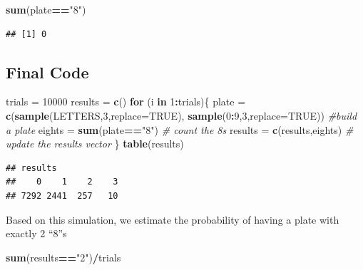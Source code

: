 \documentclass[
]{book}
\newenvironment{Shaded}{\begin{snugshade}}{\end{snugshade}}
\newcommand{\AttributeTok}[1]{\textcolor[rgb]{0.13,0.29,0.53}{#1}}
\newcommand{\CommentTok}[1]{\textcolor[rgb]{0.56,0.35,0.01}{\textit{#1}}}
\newcommand{\ConstantTok}[1]{\textcolor[rgb]{0.56,0.35,0.01}{#1}}
\newcommand{\ControlFlowTok}[1]{\textcolor[rgb]{0.13,0.29,0.53}{\textbf{#1}}}
\newcommand{\DecValTok}[1]{\textcolor[rgb]{0.00,0.00,0.81}{#1}}
\newcommand{\FunctionTok}[1]{\textcolor[rgb]{0.13,0.29,0.53}{\textbf{#1}}}
\newcommand{\NormalTok}[1]{#1}
\newcommand{\OtherTok}[1]{\textcolor[rgb]{0.56,0.35,0.01}{#1}}
\newcommand{\SpecialCharTok}[1]{\textcolor[rgb]{0.81,0.36,0.00}{\textbf{#1}}}
\newcommand{\StringTok}[1]{\textcolor[rgb]{0.31,0.60,0.02}{#1}}
\theoremstyle{definition}
\theoremstyle{definition}
\theoremstyle{definition}
\theoremstyle{definition}
\theoremstyle{remark}
\begin{document}
\begin{Shaded}
\begin{Highlighting}[]
\FunctionTok{sum}\NormalTok{(plate}\SpecialCharTok{==}\StringTok{"8"}\NormalTok{)}
\end{Highlighting}
\end{Shaded}

\begin{verbatim}
## [1] 0
\end{verbatim}

\subsection{Final Code}\label{final-code-2}

\begin{Shaded}
\begin{Highlighting}[]
\NormalTok{trials }\OtherTok{=} \DecValTok{10000}
\NormalTok{results }\OtherTok{=} \FunctionTok{c}\NormalTok{()}
\ControlFlowTok{for}\NormalTok{ (i }\ControlFlowTok{in} \DecValTok{1}\SpecialCharTok{:}\NormalTok{trials)\{}
\NormalTok{  plate }\OtherTok{=} \FunctionTok{c}\NormalTok{(}\FunctionTok{sample}\NormalTok{(LETTERS,}\DecValTok{3}\NormalTok{,}\AttributeTok{replace=}\ConstantTok{TRUE}\NormalTok{),}
            \FunctionTok{sample}\NormalTok{(}\DecValTok{0}\SpecialCharTok{:}\DecValTok{9}\NormalTok{,}\DecValTok{3}\NormalTok{,}\AttributeTok{replace=}\ConstantTok{TRUE}\NormalTok{)) }\CommentTok{\#build a plate}
\NormalTok{  eights }\OtherTok{=} \FunctionTok{sum}\NormalTok{(plate}\SpecialCharTok{==}\StringTok{"8"}\NormalTok{) }\CommentTok{\# count the 8s}
\NormalTok{  results }\OtherTok{=} \FunctionTok{c}\NormalTok{(results,eights) }\CommentTok{\# update the results vector}
\NormalTok{\}}
\FunctionTok{table}\NormalTok{(results)}
\end{Highlighting}
\end{Shaded}

\begin{verbatim}
## results
##    0    1    2    3 
## 7292 2441  257   10
\end{verbatim}

Based on this simulation, we estimate the probability of having a plate with exactly 2 ``8''s

\begin{Shaded}
\begin{Highlighting}[]
\FunctionTok{sum}\NormalTok{(results}\SpecialCharTok{==}\StringTok{"2"}\NormalTok{)}\SpecialCharTok{/}\NormalTok{trials}
\end{Highlighting}
\end{Shaded}
\end{document}
